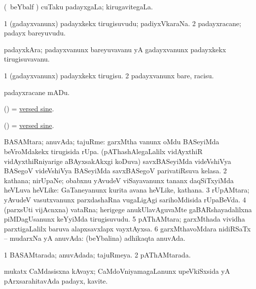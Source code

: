 \bentry
{} 
\gl{\gu}
\expl{}
\bmng
 (\kanmu\ beYbalf \vi) cuTaku padayxgaLa; kirugavitegaLa. 
\emng
\eentry

\bentry
{} 
\gl{\nA}
\expl{}
\bmng
\bnum
\num{1} (gadayxvanunx) padayxkekx tirugisuvudu; padiyxVkaraNa. 
\num{2} padayxracane; padayx bareyuvudu. 
\enum
\emng
\eentry

\bentry
{} 
\gl{\nA}
\expl{}
\bmng
 padayxkAra; padayxvanunx bareyuvavanu yA gadayxvanunx padayxkekx tirugisuvavanu. 
\emng
\eentry

\bentry
{} 
\gl{\sakirx}
\expl{}
\bmng
\bnum
\num{1} (gadayxvanunx) padayxkekx tirugisu. 
\num{2} padayxvanunx bare, racisu. 
\enum
\emng

\noindent 
\gl{\akirx}
\expl{}
\bmng
 padayxracane mADu. 
\emng
\eentry

\bentry
{} 
\gl{\nA}
\expl{}
\bmng
 (\ga) = \hyperlink{versed sine}{versed sine}. 
\emng
\eentry

\bentry
{} 
\gl{\nA}
\expl{}
\bmng
 (\ga) = \hyperlink{versed sine}{versed sine}. 
\emng
\eentry

\bentry
{} 
\gl{\nA}
\expl{}
\bmng
\bnum
{} BASAMtara; anuvAda; tajuRme: 
\banum
{} garxMtha \mo vanunx oMdu BASeyiMda beVroMdakekx tirugisida rUpa. 
 (pAThashAlegaLalilx vidAyxthiR vidAyxthiRniyarige aBAyxsakAkxgi koDuva) savxBASeyiMda videVshiVya BASegoV videVshiVya BASeyiMda savxBASegoV parivatiRsuva kelasa. 
\eanum
\numie
\num{2} kathana; nirUpaNe; obabxnu yAvudeV viSayavanunx tananx daqSiTxyiMda heVLuva heVLike:  GaTaneyanunx kurita avana heVLike, kathana. 
\num{3} rUpAMtara; yAvudeV vasutxvanunx parxdashaRna \mo vugaLigAgi sarihoMdisida rUpaBeVda. 
\num{4} (parxsUti vijAcnxna) vataRna; herigege anukUlavAguvaMte gaBARshayadalilxna piMDagUsanunx keYyiMda tirugisuvudu. 
\num{5} pAThAMtara; garxMthada vividha parxtigaLalilx baruva alapxsavxlapx vayxtAyxsa. 
\num{6} garxMthavoMdara nidiRSaTx -- mudarxNa yA anuvAda:  (beYbalina) adhikaqta anuvAda. 
\enum
\emng
\eentry

\bentry
{} 
\gl{\gu}
\expl{}
\bmng
\bnum
\num{1} BASAMtarada; anuvAdada; tajuRmeya. 
\num{2} pAThAMtarada. 
\enum
\emng
\eentry

\bentry
{} 
\gl{\nA}
\expl{\F\ }
\bmng
 mukatx CaMdasisxna kAvayx; CaMdoVniyamagaLanunx upeVkiSxsida yA pArxsarahitavAda padayx, kavite. 
\emng
\eentry

